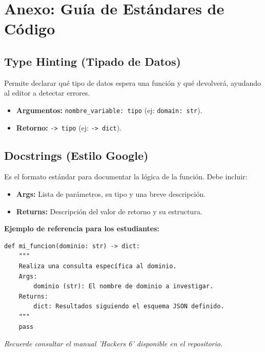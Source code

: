 \documentclass[12pt,a4paper]{article}
\begin{document}
\section{Anexo: Guía de Estándares de Código}

\subsection{Type Hinting (Tipado de Datos)}
Permite declarar qué tipo de datos espera una función y qué devolverá, ayudando al editor a detectar errores.
\begin{itemize}
    \item \textbf{Argumentos:} \texttt{nombre\_variable: tipo} (ej: \texttt{domain: str}).
    \item \textbf{Retorno:} \texttt{-> tipo} (ej: \texttt{-> dict}).
\end{itemize}

\subsection{Docstrings (Estilo Google)}
Es el formato estándar para documentar la lógica de la función. Debe incluir:
\begin{itemize}
    \item \textbf{Args:} Lista de parámetros, su tipo y una breve descripción.
    \item \textbf{Returns:} Descripción del valor de retorno y su estructura.
\end{itemize}

\textbf{Ejemplo de referencia para los estudiantes:}
\begin{verbatim}
def mi_funcion(dominio: str) -> dict:
    """
    Realiza una consulta específica al dominio.
    Args:
        dominio (str): El nombre de dominio a investigar.
    Returns:
        dict: Resultados siguiendo el esquema JSON definido.
    """
    pass
\end{verbatim}

\vfill
\centering
\textit{Recuerde consultar el manual 'Hackers 6' disponible en el repositorio.}
\end{document}
